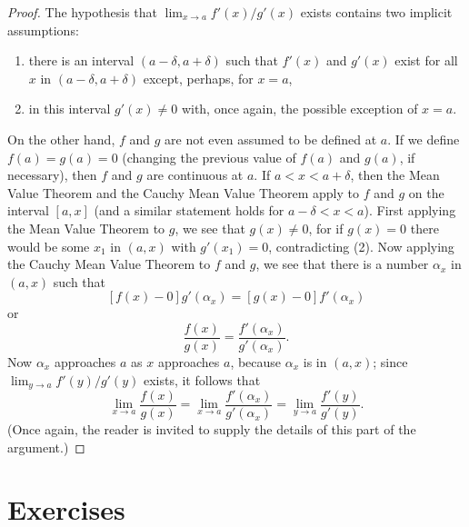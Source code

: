 \documentclass{article}
\begin{document}
\begin{proof}
  The hypothesis that $\lim_{x \to a} f'(x)/g'(x)$ exists contains two implicit
  assumptions:
  \begin{enumerate}
    \item there is an interval $(a - \delta, a + \delta)$ such that $f'(x)$ and
      $g'(x)$ exist for all $x$ in $(a - \delta, a + \delta)$ except, perhaps,
      for $x = a$,
    \item in this interval $g'(x) \neq 0$ with, once again, the possible
      exception of $x = a$.
  \end{enumerate}
  On the other hand, $f$ and $g$ are not even assumed to be defined at $a$. If
  we define $f(a) = g(a) = 0$ (changing the previous value of $f(a)$ and
  $g(a)$, if necessary), then $f$ and $g$ are continuous at $a$. If $a < x < a
  + \delta$, then the Mean Value Theorem and the Cauchy Mean Value Theorem
  apply to $f$ and $g$ on the interval $[a, x]$ (and a similar statement holds
  for $a - \delta < x < a$). First applying the Mean Value Theorem to $g$, we
  see that $g(x) \neq 0$, for if $g(x) = 0$ there would be some $x_1$ in
  $(a, x)$ with $g'(x_1) = 0$, contradicting (2). Now applying the Cauchy Mean
  Value Theorem to $f$ and $g$, we see that there is a number $\alpha_x$ in
  $(a, x)$ such that \[
    [f(x) - 0]g'(\alpha_x) = [g(x) - 0]f'(\alpha_x)
  \] or \[
    \frac{f(x)}{g(x)} = \frac{f'(\alpha_x)}{g'(\alpha_x)}.
  \] Now $\alpha_x$ approaches $a$ as $x$ approaches $a$, because $\alpha_x$ is
  in $(a, x)$; since $\lim_{y \to a} f'(y)/g'(y)$ exists, it follows that \[
    \lim_{x \to a} \frac{f(x)}{g(x)}
    = \lim_{x \to a} \frac{f'(\alpha_x)}{g'(\alpha_x)}
    = \lim_{y \to a} \frac{f'(y)}{g'(y)}.
  \] (Once again, the reader is invited to supply the details of this part of
  the argument.)
\end{proof}

\section*{Exercises}
\end{document}
